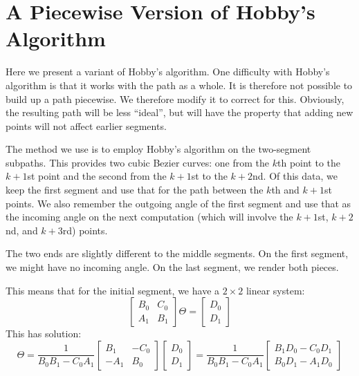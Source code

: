 \documentclass{article}
\begin{document}

\section{A Piecewise Version of Hobby's Algorithm}

Here we present a variant of Hobby's algorithm.
One difficulty with Hobby's algorithm is that it works with the path as a whole.
It is therefore not possible to build up a path piecewise.
We therefore modify it to correct for this.
Obviously, the resulting path will be less ``ideal'', but will have the property that adding new points will not affect earlier segments.

The method we use is to employ Hobby's algorithm on the two-{}segment subpaths.
This provides two cubic Bezier curves: one from the \(k\)th point to the \(k+1\)st point and the second from the \(k+1\)st to the \(k+2\)nd.
Of this data, we keep the first segment and use that for the path between the \(k\)th and \(k+1\)st points.
We also remember the outgoing angle of the first segment and use that as the incoming angle on the next computation (which will involve the \(k+1\)st, \(k+2\)nd, and \(k+3\)rd) points.

The two ends are slightly different to the middle segments.
On the first segment, we might have no incoming angle.
On the last segment, we render both pieces.

This means that for the initial segment, we have a \(2 \times 2\) linear system:
%
\[
  \begin{bmatrix}
  B_0 & C_0 \\
  A_1 & B_1
  \end{bmatrix}
  \Theta = \begin{bmatrix}
  D_0 \\ D_1
  \end{bmatrix}
\]
%
This has solution:
%
\[
  \Theta = \frac{1}{B_0 B_1 - C_0 A_1} \begin{bmatrix} B_1 & - C_0 \\ -A_1 & B_0 \end{bmatrix} \begin{bmatrix} D_0 \\ D_1 \end{bmatrix} =  \frac{1}{B_0 B_1 - C_0 A_1} \begin{bmatrix} B_1 D_0 - C_0 D_1 \\ B_0 D_1 - A_1 D_0 \end{bmatrix}
\]
\end{document}
